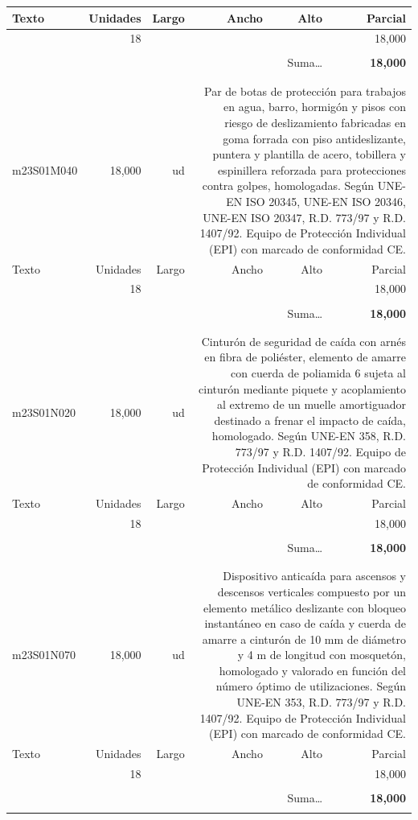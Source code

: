 \documentclass{book}%
\begin{document}
\begin{longtable}{lrrrrr}
Texto&Unidades&Largo&Ancho&Alto&Parcial\\%
\hline%
\multicolumn{1}{p{3.5cm}}{ }&18&&&&    18,000\\%
&&&&&\\%
\multicolumn{5}{r}{Suma\ldots}&\textbf{    18,000}\\%
\hline%
&&&&&\\%
&&&&&\\%
m23S01M040&    18,000& ud&\multicolumn{3}{p{6cm}}{\scriptsize Par de botas de protección para trabajos en agua, barro, hormigón y pisos con riesgo de deslizamiento fabricadas en goma forrada con piso antideslizante, puntera y plantilla de acero, tobillera y espinillera reforzada para protecciones contra golpes, homologadas. Según UNE-EN ISO 20345, UNE-EN ISO 20346, UNE-EN ISO 20347, R.D. 773/97 y R.D. 1407/92. Equipo de Protección Individual (EPI) con marcado de conformidad CE.\normalsize}\\%
Texto&Unidades&Largo&Ancho&Alto&Parcial\\%
\hline%
\multicolumn{1}{p{3.5cm}}{ }&18&&&&    18,000\\%
&&&&&\\%
\multicolumn{5}{r}{Suma\ldots}&\textbf{    18,000}\\%
\hline%
&&&&&\\%
&&&&&\\%
m23S01N020&    18,000& ud&\multicolumn{3}{p{6cm}}{\scriptsize Cinturón de seguridad de caída con arnés en fibra de poliéster, elemento de amarre con cuerda de poliamida 6 sujeta al cinturón mediante piquete y acoplamiento al extremo de un muelle amortiguador destinado a frenar el impacto de caída, homologado. Según UNE-EN 358, R.D. 773/97 y R.D. 1407/92. Equipo de Protección Individual (EPI) con marcado de conformidad CE.\normalsize}\\%
Texto&Unidades&Largo&Ancho&Alto&Parcial\\%
\hline%
\multicolumn{1}{p{3.5cm}}{ }&18&&&&    18,000\\%
&&&&&\\%
\multicolumn{5}{r}{Suma\ldots}&\textbf{    18,000}\\%
\hline%
&&&&&\\%
&&&&&\\%
m23S01N070&    18,000& ud&\multicolumn{3}{p{6cm}}{\scriptsize Dispositivo anticaída para ascensos y descensos verticales compuesto por un elemento metálico deslizante con bloqueo instantáneo en caso de caída y cuerda de amarre a cinturón de 10 mm de diámetro y 4 m de longitud con mosquetón, homologado y valorado en función del número óptimo de utilizaciones. Según UNE-EN 353, R.D. 773/97 y R.D. 1407/92. Equipo de Protección Individual (EPI) con marcado de conformidad CE.\normalsize}\\%
Texto&Unidades&Largo&Ancho&Alto&Parcial\\%
\hline%
\multicolumn{1}{p{3.5cm}}{ }&18&&&&    18,000\\%
&&&&&\\%
\multicolumn{5}{r}{Suma\ldots}&\textbf{    18,000}\\%
\hline%
&&&&&\\%
\end{longtable}%
\newpage
\end{document}
